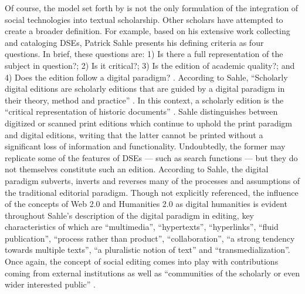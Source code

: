 \begin{paper}
Of course, the model set forth by \citeauthor{siemens_modeling_2012} is not the only formulation of the integration of social technologies into textual scholarship. Other scholars have attempted to create a broader definition. For example, based on his extensive work collecting and cataloging DSEs, Patrick Sahle presents his defining criteria as four questions. In brief, these questions are: 1) Is there a full representation of the subject in question?;  2) Is it critical?; 3) Is the edition of academic quality?; and 4) Does the edition follow a digital paradigm? \citep[38]{sahle_scholarly_2016}. According to Sahle, ``Scholarly digital editions are scholarly editions that are guided by a digital paradigm in their theory, method and practice'' \citep[28]{sahle_scholarly_2016}. In this context, a scholarly edition is the ``critical representation of historic documents'' \citep[23]{sahle_scholarly_2016}. Sahle distinguishes between digitized or scanned print editions which continue to uphold the print paradigm and digital editions, writing that the latter cannot be printed without a significant loss of information and functionality. Undoubtedly, the former may replicate some of the features of DSEs --- such as search functions --- but they do not themselves constitute such an edition. According to Sahle, the digital paradigm subverts, inverts and reverses many of the processes and assumptions of the traditional editorial paradigm. Though not explicitly referenced, the influence of the concepts of Web 2.0 and Humanities 2.0 as digital humanities is evident throughout Sahle’s description of the digital paradigm in editing, key characteristics of which are ``multimedia'', ``hypertexts'', ``hyperlinks'', ``fluid publication'', ``process rather than product'', ``collaboration'', ``a strong tendency towards multiple texts'', ``a pluralistic notion of text'' and ``transmedialization''. Once again, the concept of social editing comes into play with contributions coming from external institutions as well as ``communities of the scholarly or even wider interested public'' \citep[30]{sahle_scholarly_2016}.


\end{paper}
